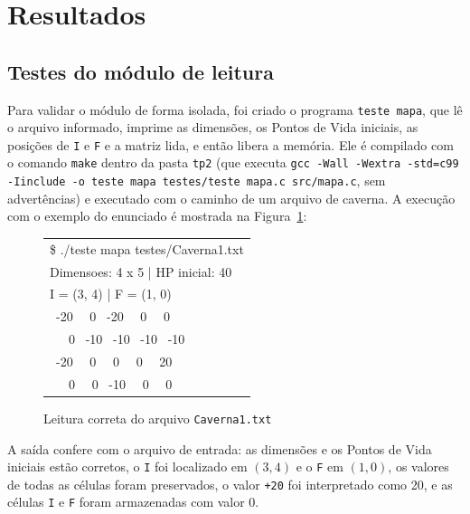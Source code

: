 \documentclass[12pt,a4paper]{article}
\makeatletter
\DeclareRobustCommand{\_}{%
  \ifmmode
    \nfss@text{\textunderscore}%
  \else
    \textunderscore\allowbreak
  \fi
}
\makeatother
\begin{document}
\section{Resultados}
 
\subsection{Testes do módulo de leitura}
 
Para validar o módulo de forma isolada, foi criado o programa \texttt{teste\_mapa}, que lê o arquivo informado, imprime as dimensões, os Pontos de Vida iniciais, as posições de \texttt{I} e \texttt{F} e a matriz lida, e então libera a memória. Ele é compilado com o comando \texttt{make} dentro da pasta \texttt{tp2} (que executa \texttt{gcc -Wall -Wextra -std=c99 -Iinclude -o teste\_mapa testes/teste\_mapa.c src/mapa.c}, sem advertências) e executado com o caminho de um arquivo de caverna. A execução com o exemplo do enunciado é mostrada na Figura~\ref{fig:teste_ok}:
 
\begin{figure}[htbp]
    \centering
    \begin{minipage}{0.8\textwidth}
        \ttfamily\small
        \begin{tabular}{|l|}
        \hline
        \$ ./teste\_mapa testes/Caverna1.txt \\
        Dimensoes: 4 x 5 | HP inicial: 40 \\
        I = (3, 4) | F = (1, 0) \\
        \ -20 \ \ 0 \ -20 \ \ 0 \ \ 0 \\
        \ \ \ 0 \ -10 \ -10 \ -10 \ -10 \\
        \ -20 \ \ 0 \ \ 0 \ \ 0 \ \ 20 \\
        \ \ \ 0 \ \ 0 \ -10 \ \ 0 \ \ 0 \\
        \hline
        \end{tabular}
    \end{minipage}
    \vspace{0.2cm}
    \caption{Leitura correta do arquivo \texttt{Caverna1.txt}}
    \label{fig:teste_ok}
\end{figure}
 
A saída confere com o arquivo de entrada: as dimensões e os Pontos de Vida iniciais estão corretos, o \texttt{I} foi localizado em $(3,4)$ e o \texttt{F} em $(1,0)$, os valores de todas as células foram preservados, o valor \texttt{+20} foi interpretado como 20, e as células \texttt{I} e \texttt{F} foram armazenadas com valor 0.
 
\end{document}
